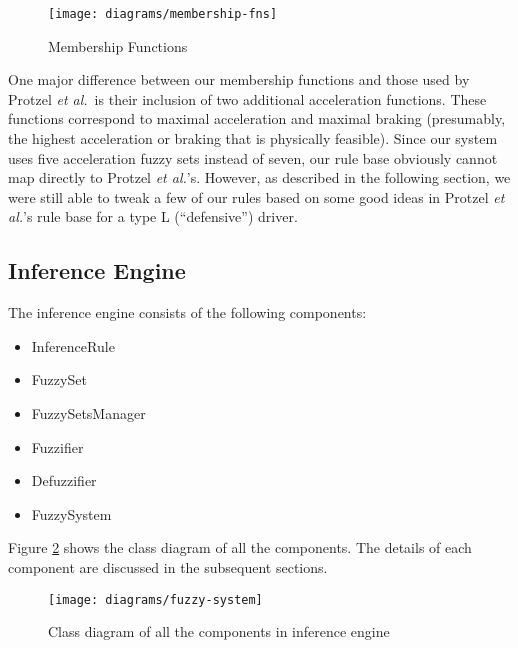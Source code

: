 \documentclass[12pt,letterpaper,oneside]{report}
\newcommand \qq[1]{``{#1}''}
\newcommand \etal{\textit{et al.}}
\begin{document}
\begin{figure}[h]
\centering
\texttt{[image: diagrams/membership-fns]}
\caption{Membership Functions} \label{fig:membership-fns}
\end{figure}

One major difference between our membership functions and those used by Protzel
\etal~is their inclusion of two additional acceleration functions.  These
functions correspond to maximal acceleration and maximal braking (presumably,
the highest acceleration or braking that is physically feasible).  Since our
system uses five acceleration fuzzy sets instead of seven, our rule base
obviously cannot map directly to Protzel \etal's. However, as described in the
following section, we were still able to tweak a few of our rules based on some
good ideas in Protzel \etal's rule base for a type L (\qq{defensive}) driver. 

\subsection{Inference Engine}
The inference engine consists of the following components:
\begin{itemize}
\item InferenceRule
\item FuzzySet
\item FuzzySetsManager
\item Fuzzifier
\item Defuzzifier
\item FuzzySystem
\end{itemize}

Figure \ref{fig:inf-class} shows the class diagram of all the components. The
details of each component are discussed in the subsequent sections.

\begin{figure}[h]
  \centering
  \texttt{[image: diagrams/fuzzy-system]} 
  \caption{Class diagram of all the components in inference engine}
  \label{fig:inf-class}
\end{figure}
\end{document}
